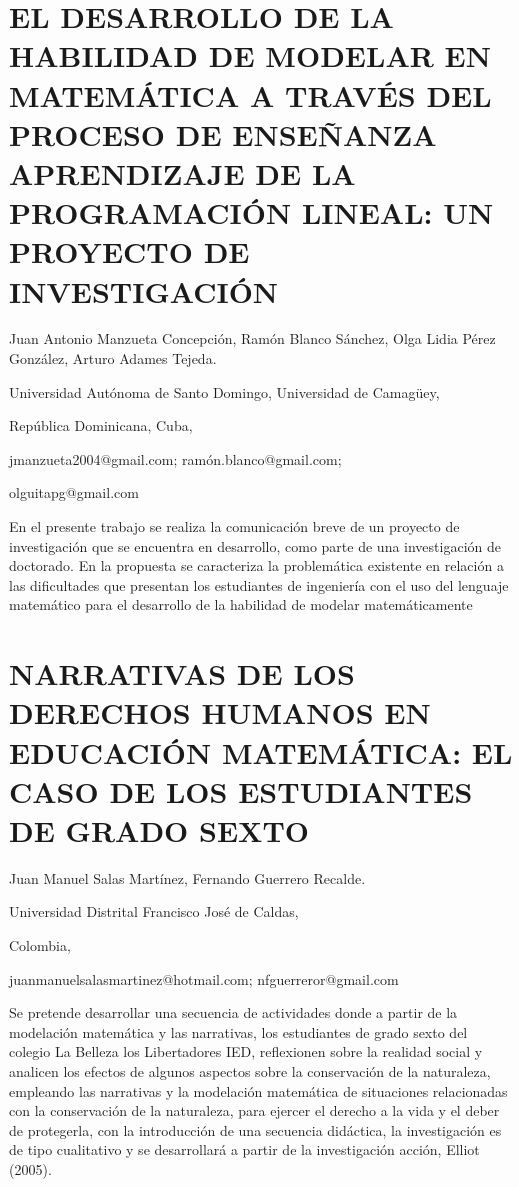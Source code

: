 \section{EL DESARROLLO DE LA HABILIDAD DE MODELAR EN MATEMÁTICA A TRAVÉS DEL
PROCESO DE ENSEÑANZA APRENDIZAJE DE LA PROGRAMACIÓN LINEAL: UN PROYECTO
DE INVESTIGACIÓN}

\begin{datos}

Juan Antonio Manzueta Concepción, Ramón Blanco Sánchez, Olga Lidia
Pérez González, Arturo Adames Tejeda.

Universidad Autónoma de Santo Domingo, Universidad de Camagüey, 

República Dominicana, Cuba,

jmanzueta2004@gmail.com; ramón.blanco@gmail.com; 

olguitapg@gmail.com

\end{datos}

En el presente trabajo se realiza la comunicación breve de un proyecto
de investigación que se encuentra en desarrollo, como parte de una
investigación de doctorado. En la propuesta se caracteriza la problemática
existente en relación a las dificultades que presentan los estudiantes
de ingeniería con el uso del lenguaje matemático para el desarrollo
de la habilidad de modelar matemáticamente


\section{NARRATIVAS DE LOS DERECHOS HUMANOS EN EDUCACIÓN MATEMÁTICA: EL CASO
DE LOS ESTUDIANTES DE GRADO SEXTO}

\begin{datos}

Juan Manuel Salas Martínez, Fernando Guerrero Recalde.

Universidad Distrital Francisco José de Caldas,

Colombia,

juanmanuelsalasmartinez@hotmail.com; nfguerreror@gmail.com

\end{datos}

Se pretende desarrollar una secuencia de actividades donde a partir
de la modelación matemática y las narrativas, los estudiantes de grado
sexto del colegio La Belleza los Libertadores IED, reflexionen sobre
la realidad social y analicen los efectos de algunos aspectos sobre
la conservación de la naturaleza, empleando las narrativas y la modelación
matemática de situaciones relacionadas con la conservación de la naturaleza,
para ejercer el derecho a la vida y el deber de protegerla, con la
introducción de una secuencia didáctica, la investigación es de tipo
cualitativo y se desarrollará a partir de la investigación acción,
Elliot (2005).


